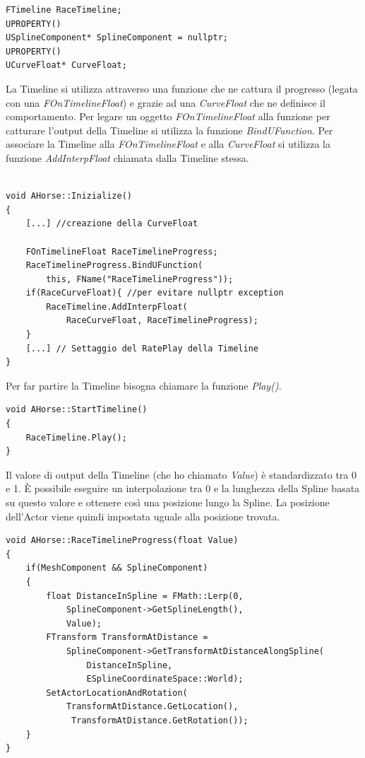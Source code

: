         \begin{lstlisting}[caption = Sezione del file header (movimento cavallo)]
FTimeline RaceTimeline;
UPROPERTY()
USplineComponent* SplineComponent = nullptr;
UPROPERTY()
UCurveFloat* CurveFloat;
        \end{lstlisting}

        La Timeline si utilizza attraverso una funzione che ne cattura il progresso (legata con una \textit{FOnTimelineFloat}) e grazie ad una \textit{CurveFloat} che ne definisce il comportamento. 
        Per legare un oggetto \textit{FOnTimelineFloat} alla funzione per catturare l'output della Timeline si utilizza la funzione \textit{BindUFunction}.
        Per associare la Timeline alla \textit{FOnTimelineFloat} e alla \textit{CurveFloat} si utilizza la funzione \textit{AddInterpFloat} chiamata dalla Timeline stessa.

        \begin{lstlisting}[caption = Inizializzazione della Timeline nel file source (movimento cavallo), label = {alg:HorseInizialize}]

void AHorse::Inizialize()
{
    [...] //creazione della CurveFloat

    FOnTimelineFloat RaceTimelineProgress;
    RaceTimelineProgress.BindUFunction(
        this, FName("RaceTimelineProgress"));
    if(RaceCurveFloat){ //per evitare nullptr exception
        RaceTimeline.AddInterpFloat(
            RaceCurveFloat, RaceTimelineProgress);
    }
    [...] // Settaggio del RatePlay della Timeline 
}

        \end{lstlisting}

        Per far partire la Timeline bisogna chiamare la funzione \textit{Play()}.

        \begin{lstlisting}
void AHorse::StartTimeline()
{
    RaceTimeline.Play();
}\end{lstlisting}

        Il valore di output della Timeline (che ho chiamato \textit{Value}) è standardizzato tra 0 e 1.
        È possibile eseguire un interpolazione tra 0 e la lunghezza della Spline basata su questo valore e ottenere così una posizione lungo la Spline.
        La posizione dell'Actor viene quindi impostata uguale alla posizione trovata.

        \begin{lstlisting}[caption = Funzione che sfrutta il valore restituito dalla timeline nel tempo  (movimento cavallo)]
void AHorse::RaceTimelineProgress(float Value)
{    
    if(MeshComponent && SplineComponent)
    {
        float DistanceInSpline = FMath::Lerp(0, 
            SplineComponent->GetSplineLength(), 
            Value);
        FTransform TransformAtDistance = 
            SplineComponent->GetTransformAtDistanceAlongSpline(
                DistanceInSpline, 
                ESplineCoordinateSpace::World);
        SetActorLocationAndRotation(
            TransformAtDistance.GetLocation(),
             TransformAtDistance.GetRotation());
    }
}
        \end{lstlisting}

